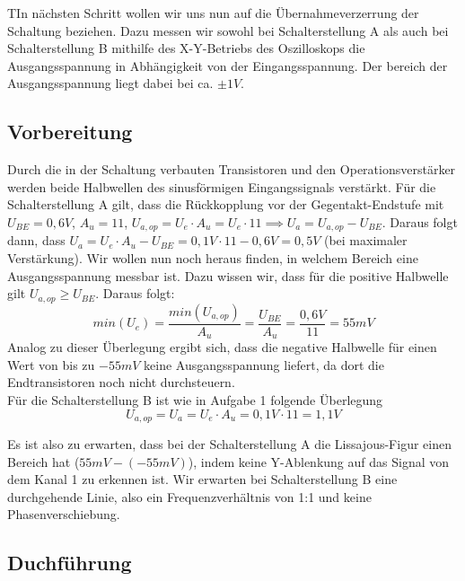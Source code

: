 \documentclass{article}
\begin{document}
\begin{task}
  TIn nächsten Schritt wollen wir uns nun auf die Übernahmeverzerrung der Schaltung beziehen. Dazu messen wir sowohl bei Schalterstellung A als auch bei Schalterstellung B mithilfe des X-Y-Betriebs des Oszilloskops die Ausgangsspannung in Abhängigkeit von der Eingangsspannung. Der bereich der Ausgangsspannung liegt dabei bei ca. $\pm 1V$.
\end{task}

\subsection{Vorbereitung}
\label{sec:vorbereitung-1}

Durch die in der Schaltung verbauten Transistoren und den Operationsverstärker werden beide Halbwellen des sinusförmigen Eingangssignals verstärkt. Für die Schalterstellung A gilt, dass die Rückkopplung vor der Gegentakt-Endstufe mit $U_{BE} = 0,6V$, $A_{u} = 11$, $U_{a,op} = U_{e} \cdot A_{u} = U_{e} \cdot 11 \implies U_{a} = U_{a,op} - U_{BE}$. Daraus folgt dann, dass $U_{a} = U_{e} \cdot A_{u} - U_{BE} = 0,1V \cdot 11 - 0,6V = 0,5V$ (bei maximaler Verstärkung). Wir wollen nun noch heraus finden, in welchem Bereich eine Ausgangsspannung messbar ist. Dazu wissen wir, dass für die positive Halbwelle gilt $U_{a,op} \geq U_{BE}$. Daraus folgt:
\begin{equation*}
  min(U_{e}) = \frac{min(U_{a,op})}{A_{u}} = \frac{U_{BE}}{A_{u}} = \frac{0,6V}{11} = 55mV
\end{equation*}
Analog zu dieser Überlegung ergibt sich, dass die negative Halbwelle für einen Wert von bis zu $-55mV$ keine Ausgangsspannung liefert, da dort die Endtransistoren noch nicht durchsteuern.\\
Für die Schalterstellung B ist wie in Aufgabe 1 folgende Überlegung
\begin{equation*}
  U_{a,op} = U_{a} = U_{e} \cdot A_{u} = 0,1V \cdot 11 = 1,1V
\end{equation*}

Es ist also zu erwarten, dass bei der Schalterstellung A die Lissajous-Figur einen Bereich hat ($55mV-(-55mV)$), indem keine Y-Ablenkung auf das Signal von dem Kanal 1 zu erkennen ist. Wir erwarten bei Schalterstellung B eine durchgehende Linie, also ein Frequenzverhältnis von 1:1 und keine Phasenverschiebung.

\subsection{Duchführung}
\label{sec:duchfuhrung-1}
\end{document}
